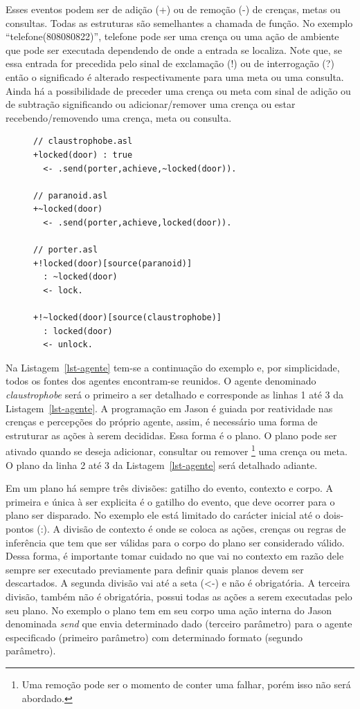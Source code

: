 Esses eventos podem ser de adição (+) ou de remoção (-) de crenças, metas ou
consultas. Todas as estruturas são semelhantes a chamada de função. No
exemplo ``telefone(808080822)'', telefone pode ser uma crença ou uma ação de
ambiente que pode ser executada dependendo de onde a entrada se localiza.
Note que, se essa entrada for precedida pelo sinal de exclamação (!) ou de
interrogação (?) então o significado é alterado respectivamente para uma meta
ou uma consulta. Ainda há a possibilidade de preceder uma crença ou meta
com sinal de adição ou de subtração significando ou adicionar/remover uma
crença ou estar recebendo/removendo uma crença, meta ou consulta.

\lstset{linewidth=75mm}
\begin{figure}
	\begin{lstlisting}[frame=trbl, caption=Agentes em ASL, label=lst-agente]
// claustrophobe.asl
+locked(door) : true
  <- .send(porter,achieve,~locked(door)).

// paranoid.asl
+~locked(door)
  <- .send(porter,achieve,locked(door)).

// porter.asl
+!locked(door)[source(paranoid)]
  : ~locked(door)
  <- lock.

+!~locked(door)[source(claustrophobe)]
  : locked(door)
  <- unlock.
	\end{lstlisting}
\end{figure}
%
Na Listagem~\ref{lst-agente} tem-se a continuação do exemplo e, por
simplicidade, todos os fontes dos agentes encontram-se reunidos. O agente denominado
\emph{claustrophobe} será o primeiro a ser detalhado e corresponde as linhas 1 até 3
da Listagem~\ref{lst-agente}. A programação em Jason é
guiada por reatividade nas crenças e percepções do próprio agente, assim, é necessário
uma forma de estruturar as ações à serem decididas. Essa forma é o plano.
O plano pode ser ativado quando se deseja adicionar, consultar ou remover \footnote{Uma remoção pode ser o momento de conter uma falhar, porém isso não será abordado.}
 uma crença ou meta. O plano da linha 2 até 3 da
Listagem~\ref{lst-agente} será detalhado adiante.

Em um plano há sempre três divisões: gatilho do evento, contexto e corpo.
A primeira e única à ser explicita é o gatilho do evento, que deve ocorrer para
o plano ser disparado. No exemplo ele está limitado do carácter inicial até
o dois-pontos (:). A divisão de contexto é onde se coloca as ações, crenças
ou regras de inferência que tem que ser válidas para o corpo do plano ser
considerado válido. Dessa forma, é
importante tomar cuidado no que vai no contexto em razão dele sempre ser
executado previamente para definir quais planos devem ser descartados.
A segunda divisão vai até a seta (<-) e não é obrigatória.
A terceira divisão, também não é obrigatória, possui todas as ações a serem executadas pelo
seu plano. No exemplo o plano tem em seu corpo uma ação interna do Jason
denominada \emph{send} que envia determinado dado (terceiro parâmetro) para o
agente especificado (primeiro parâmetro) com determinado formato (segundo parâmetro).

